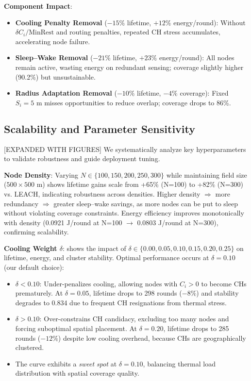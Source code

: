 \textbf{Component Impact}:
\begin{itemize}[noitemsep]
  \item \textbf{Cooling Penalty Removal} ($-15\%$ lifetime, $+12\%$ energy/round): Without $\delta C_i/\text{MinRest}$ and routing penalties, repeated CH stress accumulates, accelerating node failure.
  \item \textbf{Sleep--Wake Removal} ($-21\%$ lifetime, $+23\%$ energy/round): All nodes remain active, wasting energy on redundant sensing; coverage slightly higher (90.2\%) but unsustainable.
  \item \textbf{Radius Adaptation Removal} ($-10\%$ lifetime, $-4\%$ coverage): Fixed $S_i=5$ m misses opportunities to reduce overlap; coverage drops to 86\%.
\end{itemize}

\subsection{Scalability and Parameter Sensitivity}
\label{subsec:sensitivity}

[EXPANDED WITH FIGURES] We systematically analyze key hyperparameters to validate robustness and guide deployment tuning.

\textbf{Node Density}: Varying $N \in \{100, 150, 200, 250, 300\}$ while maintaining field size ($500 \times 500$ m) shows lifetime gains scale from +65\% (N=100) to +82\% (N=300) vs. LEACH, indicating robustness across densities. Higher density $\Rightarrow$ more redundancy $\Rightarrow$ greater sleep--wake savings, as more nodes can be put to sleep without violating coverage constraints. Energy efficiency improves monotonically with density (0.0921 J/round at N=100 $\to$ 0.0803 J/round at N=300), confirming scalability.

\textbf{Cooling Weight $\delta$}:  shows the impact of $\delta \in \{0.00, 0.05, 0.10, 0.15, 0.20, 0.25\}$ on lifetime, energy, and cluster stability. Optimal performance occurs at $\delta=0.10$ (our default choice):
\begin{itemize}[noitemsep]
  \item $\delta < 0.10$: Under-penalizes cooling, allowing nodes with $C_i>0$ to become CHs prematurely. At $\delta=0.05$, lifetime drops to 298 rounds ($-8\%$) and stability degrades to 0.834 due to frequent CH resignations from thermal stress.
  \item $\delta > 0.10$: Over-constrains CH candidacy, excluding too many nodes and forcing suboptimal spatial placement. At $\delta=0.20$, lifetime drops to 285 rounds ($-12\%$) despite low cooling overhead, because CHs are geographically clustered.
  \item The curve exhibits a \emph{sweet spot} at $\delta=0.10$, balancing thermal load distribution with spatial coverage quality.
\end{itemize}

